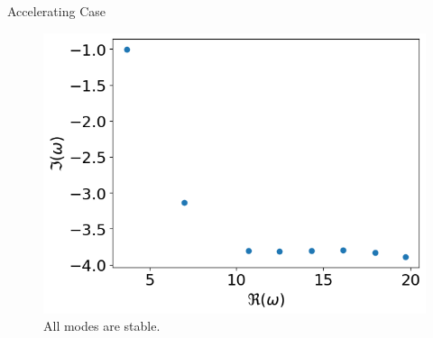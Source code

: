 \begin{frame}{Accelerating Case}
  \begin{figure} [H]
    \centering
    \includegraphics[width=0.7\linewidth]{../../thesis/img/numerical-experiments/accelerating-v}
    \caption{All modes are stable.}
  \end{figure}
\end{frame}
